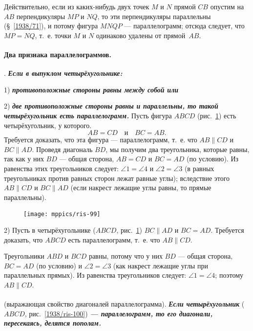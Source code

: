 \documentclass[oneside]{book}
\begin{document}
Действительно, если из каких-нибудь двух точек $M$ и $N$ прямой $CB$ опустим на $AB$ перпендикуляры $MP$ и $NQ$, то эти перпендикуляры параллельны (§~\ref{1938/71}), и потому фигура $MNQP$ — параллелограмм;
отсюда следует, что $MP=NQ$, т.~е. точки $M$ и $N$ одинаково удалены от прямой~$AB$.

\paragraph{Два признака параллелограммов.}\label{1938/89}

\mbox{.}
\textbf{\emph{Если в выпуклом четырёхугольнике:}}

1) \textbf{\emph{противоположные стороны равны между собой или}}

2) \textbf{\emph{две противоположные стороны равны и параллельны, то такой четырёхугольник есть параллелограмм.}}
Пусть фигура $ABCD$ (рис.~\ref{1938/ris-99}) есть четырёхугольник, у которого.
\[AB=CD\quad \text{и}\quad BC=AB.\]
Требуется доказать, что эта фигура — параллелограмм, т.~е. что $AB\parallel CD$ и $BC \parallel AD$.
Проведя диагональ $BD$, мы получим два треугольника, которые равны, так как у них $BD$ — общая сторона, $AB=CD$ и $BC = AD$ (по условию).
Из равенства этих треугольников следует:
$\angle 1 = \angle 4 $ и $\angle 2 = \angle 3$ (в равных треугольниках против равных сторон лежат равные углы);
вследствие этого $AB \parallel CD$ и $BC\parallel AD$ (если накрест лежащие углы равны, то прямые параллельны).

\begin{figure}
\centering
\texttt{[image: mppics/ris-99]}
\caption{}\label{1938/ris-99}
\end{figure}

2) Пусть в четырёхугольнике ($ABCD$, рис.~\ref{1938/ris-99}) $BC\parallel AD$ и $BC = AD$.
Требуется доказать, что $ABCD$ есть параллелограмм, т.~е. что $AB \parallel CD$.

Треугольники $ABD$ и $BCD$ равны, потому что у них $BD$ — общая сторона, $BC = AD$ (по условию) и $\angle 2 = \angle 3$ (как накрест лежащие углы при параллельных прямых).
Из равенства треугольников следует:
$\angle 1 = \angle 4$;
поэтому $AB\parallel CD$.

\paragraph{}\label{1938/90}
 (выражающая свойство диагоналей параллелограмма).
\textbf{\emph{Если четырёхугольник}} ($ABCD$, рис.~\ref{1938/ris-100}) \textbf{\emph{— параллелограмм, то его диагонали, пересекаясь, делятся пополам.}}
\end{document}
